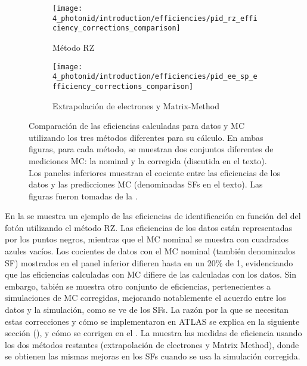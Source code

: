 \begin{figure}[ht!]
    \centering
    \begin{subfigure}[h]{0.49\linewidth}
        \centering
        \texttt{[image: 4\_photonid/introduction/efficiencies/pid\_rz\_efficiency\_corrections\_comparison]}
        \caption{M\'etodo \acf{RZ}}
        \label{fig:pid_ss:pid:efficiencies:efficiencies_old:rz}
    \end{subfigure}
    \hfill
    \begin{subfigure}[h]{0.49\linewidth}
        \centering
        \texttt{[image: 4\_photonid/introduction/efficiencies/pid\_ee\_sp\_efficiency\_corrections\_comparison]}
        \caption{Extrapolaci\'on de electrones y Matrix-Method}
        \label{fig:pid_ss:pid:efficiencies:efficiencies_old:ee_sp}
    \end{subfigure}
    \caption{Comparación de las eficiencias calculadas para datos y \ac{MC} utilizando los tres m\'etodos diferentes para su c\'alculo. En ambas figuras, para cada método, se muestran dos conjuntos diferentes de mediciones \ac{MC}: la nominal y la corregida (discutida en el texto). Los paneles inferiores muestran el cociente entre las eficiencias de los datos y las predicciones \ac{MC} (denominadas \acfp{SF} en el texto). Las figuras fueron tomadas de la .}
    \label{fig:pid_ss:pid:efficiencies:efficiencies_old}
\end{figure}


En la \Fig{\ref{fig:pid_ss:pid:efficiencies:efficiencies_old:rz}} se muestra un ejemplo de las eficiencias de identificación en función del \pt del fotón utilizando el método \ac{RZ}. Las eficiencias de los datos están representadas por los puntos negros, mientras que el \ac{MC} nominal se muestra con cuadrados azules vacíos. Los cocientes de datos con el \ac{MC} nominal (también denominados \acf{SF}) mostrados en el panel inferior difieren hasta en un 20\% de 1, evidenciando que las eficiencias calculadas con \ac{MC} difiere de las calculadas con los datos. Sin embargo, tabi\'en se muestra otro conjunto de eficiencias, pertenecientes a simulaciones de \ac{MC} corregidas, mejorando notablemente el acuerdo entre los datos y la simulación, como se ve de los \acp{SF}. La razón por la que se necesitan estas correcciones y cómo se implementaron en \ac{ATLAS} se explica en la siguiente sección (\Sect{\ref{sec:pid_ss:ss_differences}}), y cómo se corrigen en el \Ch{\ref{ch:ss_corrections}}. La \Fig{\ref{fig:pid_ss:pid:efficiencies:efficiencies_old:ee_sp}} muestra las medidas de eficiencia usando los dos métodos restantes (extrapolación de electrones y Matrix Method), donde se obtienen las mismas mejoras en los \acp{SF} cuando se usa la simulación corregida.


